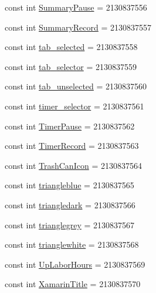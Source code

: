 \begin{DoxyCompactItemize}
\item 
const int \hyperlink{class_field_service_1_1_android_1_1_resource_1_1_drawable_ae9ff677a00bd41f4b6794cfbba6661ee}{Summary\+Pause} = 2130837556
\item 
const int \hyperlink{class_field_service_1_1_android_1_1_resource_1_1_drawable_aa3057846ebe934a3acba25440601880f}{Summary\+Record} = 2130837557
\item 
const int \hyperlink{class_field_service_1_1_android_1_1_resource_1_1_drawable_a008525f92fba5b4af5f4b2aca930f6d3}{tab\+\_\+selected} = 2130837558
\item 
const int \hyperlink{class_field_service_1_1_android_1_1_resource_1_1_drawable_aa3d6cff38fea2178fc358d6f4fa04023}{tab\+\_\+selector} = 2130837559
\item 
const int \hyperlink{class_field_service_1_1_android_1_1_resource_1_1_drawable_a6f2a54d25460d5d1db41d6fed8f46a32}{tab\+\_\+unselected} = 2130837560
\item 
const int \hyperlink{class_field_service_1_1_android_1_1_resource_1_1_drawable_aec2ca1dffe76ba5eec755fd3fe84b67b}{timer\+\_\+selector} = 2130837561
\item 
const int \hyperlink{class_field_service_1_1_android_1_1_resource_1_1_drawable_a11201192dd04c5060e2a5eff460b92e8}{Timer\+Pause} = 2130837562
\item 
const int \hyperlink{class_field_service_1_1_android_1_1_resource_1_1_drawable_a2f98c10064be7d69b39f75acdaa7ab59}{Timer\+Record} = 2130837563
\item 
const int \hyperlink{class_field_service_1_1_android_1_1_resource_1_1_drawable_a8258fae827930b692f47fd28db5533a5}{Trash\+Can\+Icon} = 2130837564
\item 
const int \hyperlink{class_field_service_1_1_android_1_1_resource_1_1_drawable_a76572f4522a650aa2f1be91a90341b49}{triangleblue} = 2130837565
\item 
const int \hyperlink{class_field_service_1_1_android_1_1_resource_1_1_drawable_a46d74914a73dce3e60b25cac0bdefb53}{triangledark} = 2130837566
\item 
const int \hyperlink{class_field_service_1_1_android_1_1_resource_1_1_drawable_a9fc34b22aa2e3386690769d71c55f681}{trianglegrey} = 2130837567
\item 
const int \hyperlink{class_field_service_1_1_android_1_1_resource_1_1_drawable_a0624d7b07bf4b772ef3a9e0fcc30d57b}{trianglewhite} = 2130837568
\item 
const int \hyperlink{class_field_service_1_1_android_1_1_resource_1_1_drawable_af2603b39d0c21e6889573ac6ecc9b316}{Up\+Labor\+Hours} = 2130837569
\item 
const int \hyperlink{class_field_service_1_1_android_1_1_resource_1_1_drawable_a5254df0d3b0dcc12401a298d8adfaa71}{Xamarin\+Title} = 2130837570
\end{DoxyCompactItemize}


